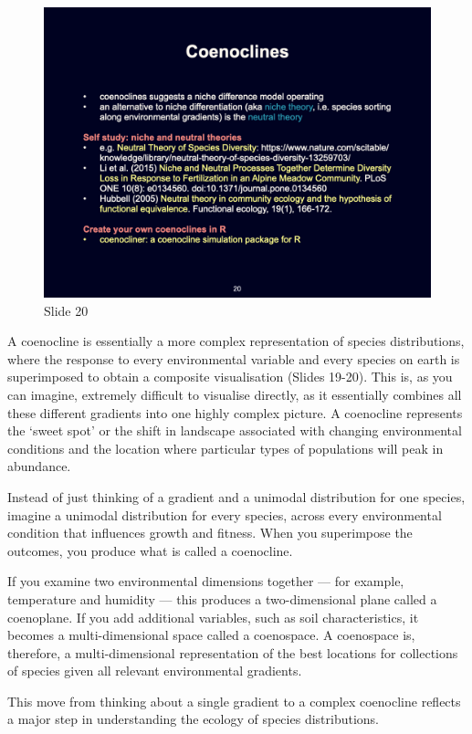 \documentclass[
  10pt,
]{book}
\begin{document}
\begin{figure}[ht]
\centering
\includegraphics[width=0.8\linewidth]{../images/BDC334/BDC334-020.jpeg}
\caption*{Slide 20}
\end{figure}

A coenocline is essentially a more complex representation of species
distributions, where the response to every environmental variable and
every species on earth is superimposed to obtain a composite
visualisation (Slides 19-20). This is, as you can imagine, extremely
difficult to visualise directly, as it essentially combines all these
different gradients into one highly complex picture. A coenocline
represents the `sweet spot' or the shift in landscape associated with
changing environmental conditions and the location where particular
types of populations will peak in abundance.

Instead of just thinking of a gradient and a unimodal distribution for
one species, imagine a unimodal distribution for every species, across
every environmental condition that influences growth and fitness. When
you superimpose the outcomes, you produce what is called a coenocline.

If you examine two environmental dimensions together --- for example,
temperature and humidity --- this produces a two-dimensional plane
called a coenoplane. If you add additional variables, such as soil
characteristics, it becomes a multi-dimensional space called a
coenospace. A coenospace is, therefore, a multi-dimensional
representation of the best locations for collections of species given
all relevant environmental gradients.

This move from thinking about a single gradient to a complex coenocline
reflects a major step in understanding the ecology of species
distributions.
\end{document}
